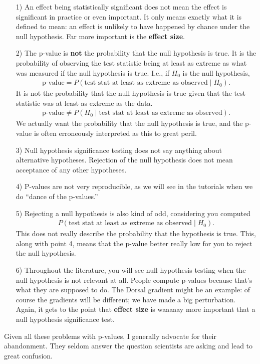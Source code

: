 \begin{itemize}
\item[1)] An effect being statistically significant does not mean the effect is significant in practice or even important.  It only means exactly what it is defined to mean: an effect is unlikely to have happened by chance under the null hypothesis.  Far more important is the \textbf{effect size}.
\item[2)] The p-value is \textbf{not} the probability that the null hypothesis is true.  It is the probability of observing the test statistic being at least as extreme as what was measured if the null hypothesis is true.  I.e., if $H_0$ is the null hypothesis,
\begin{align}
    \text{p-value} = P(\text{test stat at least as extreme as observed}\mid H_0).
\end{align}
It is not the probability that the null hypothesis is true given that the test statistic was at least as extreme as the data.
\begin{align}
    \text{p-value} \ne P(H_0\mid\text{test stat at least as extreme as observed}).
\end{align}
We actually want the probability that the null hypothesis is true, and the p-value is often erroneously interpreted as this to great peril.
\item[3)] Null hypothesis significance testing does not say anything about alternative hypotheses.  Rejection of the null hypothesis does not mean acceptance of any other hypotheses.
\item[4)] P-values are not very reproducible, as we will see in the tutorials when we do ``dance of the p-values.''
\item[5)] Rejecting a null hypothesis is also kind of odd, considering you computed
\begin{align}
P(\text{test stat at least as extreme as observed}\mid H_0).
\end{align}
This does not really describe the probability that the hypothesis is true.
This, along with point 4, means that the p-value better really low for you to reject the null hypothesis.
\item[6)] Throughout the literature, you will see null hypothesis testing when the null hypothesis is not relevant at all.  People compute p-values because that's what they are supposed to do.  The Dorsal gradient might be an example: of course the gradients will be different; we have made a big perturbation.  Again, it gets to the point that \textbf{effect size} is waaaaay more important that a null hypothesis significance test.
\end{itemize}

Given all these problems with p-values, I generally advocate for their abandonment.  They seldom answer the question scientists are asking and lead to great confusion.
